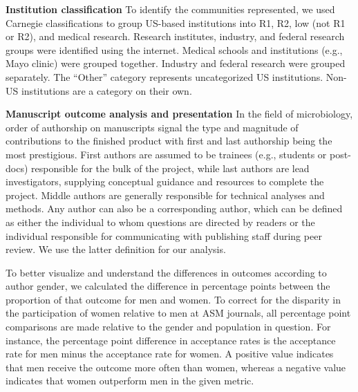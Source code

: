 \documentclass[11pt,]{article}
\begin{document}
\textbf{Institution classification} To identify the communities
represented, we used Carnegie classifications to group US-based
institutions into R1, R2, low (not R1 or R2), and medical research.
Research institutes, industry, and federal research groups were
identified using the internet. Medical schools and institutions (e.g.,
Mayo clinic) were grouped together. Industry and federal research were
grouped separately. The ``Other'' category represents uncategorized US
institutions. Non-US institutions are a category on their own.

\textbf{Manuscript outcome analysis and presentation} In the field of
microbiology, order of authorship on manuscripts signal the type and
magnitude of contributions to the finished product with first and last
authorship being the most prestigious. First authors are assumed to be
trainees (e.g., students or post-docs) responsible for the bulk of the
project, while last authors are lead investigators, supplying conceptual
guidance and resources to complete the project. Middle authors are
generally responsible for technical analyses and methods. Any author can
also be a corresponding author, which can be defined as either the
individual to whom questions are directed by readers or the individual
responsible for communicating with publishing staff during peer review.
We use the latter definition for our analysis.

To better visualize and understand the differences in outcomes according
to author gender, we calculated the difference in percentage points
between the proportion of that outcome for men and women. To correct for
the disparity in the participation of women relative to men at ASM
journals, all percentage point comparisons are made relative to the
gender and population in question. For instance, the percentage point
difference in acceptance rates is the acceptance rate for men minus the
acceptance rate for women. A positive value indicates that men receive
the outcome more often than women, whereas a negative value indicates
that women outperform men in the given metric.
\end{document}
